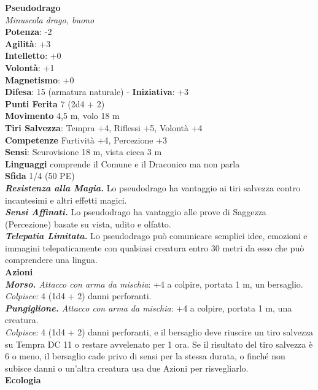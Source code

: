 \begin{multicols}{2}
\medskip\textbf{Pseudodrago}\\
\emph{Minuscola drago, buono}\\
\textbf{Potenza}: -2\\
\textbf{Agilità}: +3\\
\textbf{Intelletto}: +0\\
\textbf{Volontà}: +1\\
\textbf{Magnetismo}: +0\\
\textbf{Difesa}: 15 (armatura naturale) - \textbf{Iniziativa}: +3\\
\textbf{Punti Ferita} 7 (2d4 + 2)\\
\textbf{Movimento} 4,5 m, volo 18 m\\
\textbf{Tiri Salvezza}: Tempra +4, Riflessi +5, Volontà +4\\
\textbf{Competenze} Furtività +4, Percezione +3\\
\textbf{Sensi}: Scurovisione 18 m, vista cieca 3 m\\
\textbf{Linguaggi} comprende il Comune e il Draconico ma non parla\\
\textbf{Sfida} 1/4 (50 PE)\smallskip\\
\emph{\textbf{Resistenza alla Magia.}} Lo pseudodrago ha vantaggio ai tiri salvezza contro incantesimi e altri effetti magici.\\
\emph{\textbf{Sensi Affinati.}} Lo pseudodrago ha vantaggio alle prove di Saggezza (Percezione) basate su vista, udito e olfatto.\\
\emph{\textbf{Telepatia Limitata.}} Lo pseudodrago può comunicare semplici idee, emozioni e immagini telepaticamente con qualsiasi creatura entro 30 metri da esso che può comprendere una lingua. \\
\smallskip\textbf{Azioni}\\
\emph{\textbf{Morso.} Attacco con arma da mischia}: +4 a colpire, portata 1 m, un bersaglio.\\
\emph{Colpisce:} 4 (1d4 + 2) danni perforanti.\\
\emph{\textbf{Pungiglione.} Attacco con arma da mischia}: +4 a colpire, portata 1 m, una creatura.\\
\emph{Colpisce:} 4 (1d4 + 2) danni perforanti, e il bersaglio deve riuscire un tiro salvezza su Tempra DC 11 o restare avvelenato per 1 ora. Se il risultato del tiro salvezza è 6 o meno, il bersaglio cade privo di sensi per la stessa durata, o finché non subisce danni o un'altra creatura usa due Azioni per risvegliarlo.\\
\textbf{Ecologia}\\

\end{multicols}

